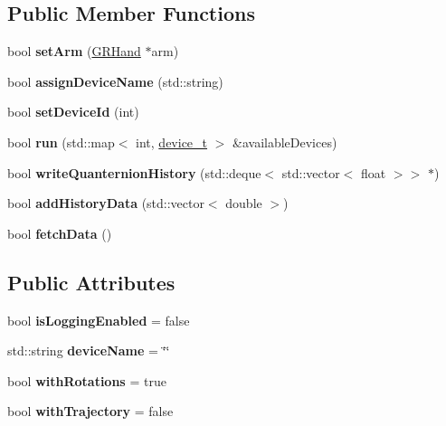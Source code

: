\subsection*{Public Member Functions}
\begin{DoxyCompactItemize}
\item 
\mbox{\label{classGRDataApplier_af9351d76761933e47b143c3a5c08fb65}} 
bool {\bfseries set\+Arm} (\mbox{\hyperlink{classGRHand}{G\+R\+Hand}} $\ast$arm)
\item 
\mbox{\label{classGRDataApplier_a361b287ce3d99356d7b01551ee2f99f3}} 
bool {\bfseries assign\+Device\+Name} (std\+::string)
\item 
\mbox{\label{classGRDataApplier_a26896ba87057580ab1854890c81808e4}} 
bool {\bfseries set\+Device\+Id} (int)
\item 
\mbox{\label{classGRDataApplier_afcf71d19945211e593bd2ed385ceeed5}} 
bool {\bfseries run} (std\+::map$<$ int, \mbox{\hyperlink{structdevice__t}{device\+\_\+t}} $>$ \&available\+Devices)
\item 
\mbox{\label{classGRDataApplier_af3a617c084d2bd513cb6ed4c79882625}} 
bool {\bfseries write\+Quanternion\+History} (std\+::deque$<$ std\+::vector$<$ float $>$$>$ $\ast$)
\item 
\mbox{\label{classGRDataApplier_a0691b6b161f67c3ca9d7793be9b2e680}} 
bool {\bfseries add\+History\+Data} (std\+::vector$<$ double $>$)
\item 
\mbox{\label{classGRDataApplier_aca6587a06b6c25ec7bb8595d88a03ef7}} 
bool {\bfseries fetch\+Data} ()
\end{DoxyCompactItemize}
\subsection*{Public Attributes}
\begin{DoxyCompactItemize}
\item 
\mbox{\label{classGRDataApplier_ac5b4d3a20996663e73ca365f2fc62b0f}} 
bool {\bfseries is\+Logging\+Enabled} = false
\item 
\mbox{\label{classGRDataApplier_a0827d46055a066b21b92a40558e3c4f9}} 
std\+::string {\bfseries device\+Name} = \char`\"{}\char`\"{}
\item 
\mbox{\label{classGRDataApplier_aa5cc0ea7c92a172b7ffa3a349b563a7f}} 
bool {\bfseries with\+Rotations} = true
\item 
\mbox{\label{classGRDataApplier_abf5765beb494672da7666ba813245409}} 
bool {\bfseries with\+Trajectory} = false
\end{DoxyCompactItemize}


